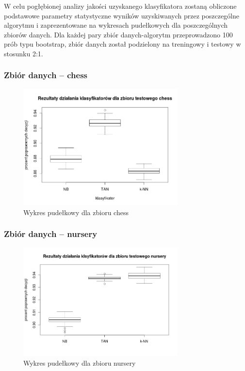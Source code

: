 \documentclass[paper=a4, fontsize=11pt]{scrartcl} %
\numberwithin{equation}{section} %
\numberwithin{figure}{section} %
\numberwithin{table}{section} %
\begin{document}
W celu pogłębionej analizy jakości uzyskanego klasyfikatora zostaną obliczone podstawowe parametry statystyczne wyników uzyskiwanych przez poszczególne algorytmu i zaprezentowane na wykresach pudełkowych dla poszczególnych zbiorów danych.
Dla każdej pary zbiór danych-algorytm przeprowadzono 100 prób typu bootstrap, zbiór danych został podzielony na treningowy i testowy w stosunku 2:1.

\subsubsection{Zbiór danych -- chess}
\begin{figure}[!h]
 \centering
\includegraphics[width=0.75\textwidth]{chess_pic.png}
 \caption{Wykres pudełkowy dla zbioru chess}
 \label{fig:model_drzewa}
\end{figure}

\clearpage

\subsubsection{Zbiór danych -- nursery}
\begin{figure}[!h]
 \centering
\includegraphics[width=0.75\textwidth]{nursery_pic.png}
 \caption{Wykres pudełkowy dla zbioru nursery}
 \label{fig:model_drzewa}
\end{figure}
\clearpage
\end{document}
